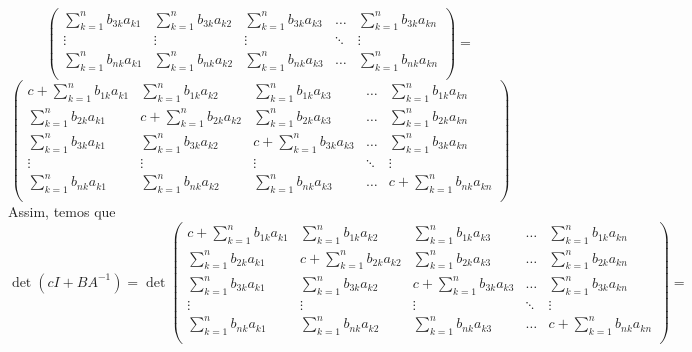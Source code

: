 \documentclass[11pt,a4paper]{article}
\begin{document}
{\[\begin{pmatrix}
\sum\limits_{k = 1}^n b_{3k}a_{k1} & \sum\limits_{k = 1}^n b_{3k}a_{k2}  &\sum\limits_{k = 1}^n b_{3k}a_{k3}  & \ldots &\sum\limits_{k = 1}^n b_{3k}a_{kn} \\
\vdots & \vdots & \vdots & \ddots & \vdots \\
\sum\limits_{k = 1}^n b_{nk}a_{k1} & \sum\limits_{k = 1}^n b_{nk}a_{k2}  &\sum\limits_{k = 1}^n b_{nk}a_{k3}  & \ldots &\sum\limits_{k = 1}^n b_{nk}a_{kn} \\
\end{pmatrix} = \]\[ \begin{pmatrix}
c + \sum\limits_{k = 1}^n b_{1k}a_{k1} & \sum\limits_{k = 1}^n b_{1k}a_{k2}  &\sum\limits_{k = 1}^n b_{1k}a_{k3}  & \ldots &\sum\limits_{k = 1}^n b_{1k}a_{kn}  \\
\sum\limits_{k = 1}^n b_{2k}a_{k1} & c + \sum\limits_{k = 1}^n b_{2k}a_{k2}  &\sum\limits_{k = 1}^n b_{2k}a_{k3}  & \ldots &\sum\limits_{k = 1}^n b_{2k}a_{kn}  \\
\sum\limits_{k = 1}^n b_{3k}a_{k1} & \sum\limits_{k = 1}^n b_{3k}a_{k2}  &c + \sum\limits_{k = 1}^n b_{3k}a_{k3}  & \ldots &\sum\limits_{k = 1}^n b_{3k}a_{kn} \\
\vdots & \vdots & \vdots & \ddots & \vdots \\
\sum\limits_{k = 1}^n b_{nk}a_{k1} & \sum\limits_{k = 1}^n b_{nk}a_{k2}  &\sum\limits_{k = 1}^n b_{nk}a_{k3}  & \ldots &c + \sum\limits_{k = 1}^n b_{nk}a_{kn} \\
\end{pmatrix}
\]
Assim, temos que
\[
\det(cI + BA^{-1}) = \det \begin{pmatrix}
c + \sum\limits_{k = 1}^n b_{1k}a_{k1} & \sum\limits_{k = 1}^n b_{1k}a_{k2}  &\sum\limits_{k = 1}^n b_{1k}a_{k3}  & \ldots &\sum\limits_{k = 1}^n b_{1k}a_{kn}  \\
\sum\limits_{k = 1}^n b_{2k}a_{k1} & c + \sum\limits_{k = 1}^n b_{2k}a_{k2}  &\sum\limits_{k = 1}^n b_{2k}a_{k3}  & \ldots &\sum\limits_{k = 1}^n b_{2k}a_{kn}  \\
\sum\limits_{k = 1}^n b_{3k}a_{k1} & \sum\limits_{k = 1}^n b_{3k}a_{k2}  &c + \sum\limits_{k = 1}^n b_{3k}a_{k3}  & \ldots &\sum\limits_{k = 1}^n b_{3k}a_{kn} \\
\vdots & \vdots & \vdots & \ddots & \vdots \\
\sum\limits_{k = 1}^n b_{nk}a_{k1} & \sum\limits_{k = 1}^n b_{nk}a_{k2}  &\sum\limits_{k = 1}^n b_{nk}a_{k3}  & \ldots &c + \sum\limits_{k = 1}^n b_{nk}a_{kn} \\
\end{pmatrix} = 
\]}
\end{document}

